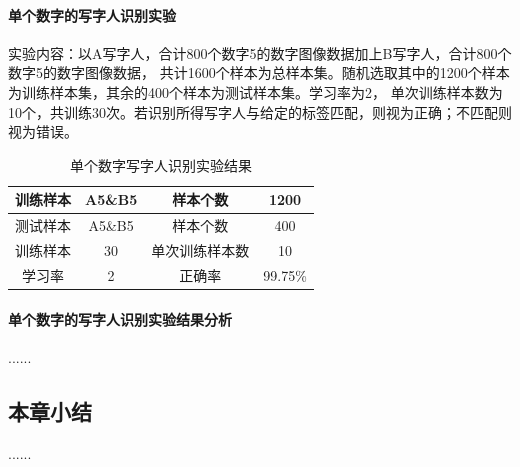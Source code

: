 \paragraph{单个数字的写字人识别实验}
实验内容：以A写字人，合计800个数字5的数字图像数据加上B写字人，合计800个数字5的数字图像数据，
共计1600个样本为总样本集。随机选取其中的1200个样本为训练样本集，其余的400个样本为测试样本集。学习率为2，
单次训练样本数为10个，共训练30次。若识别所得写字人与给定的标签匹配，则视为正确；不匹配则视为错误。
\begin{table}[!htbp]
    \centering
    \caption{单个数字写字人识别实验结果}
    \begin{tabular}[\textwidth]{c|c|c|c}
        \hline
        训练样本 & A5\&B5 & 样本个数 & 1200 \\
        \hline
        测试样本 & A5\&B5 & 样本个数 & 400 \\
        \hline
        训练样本 & 30 & 单次训练样本数 & 10 \\
        \hline
        学习率 & 2 & 正确率 & 99.75\% \\
        \hline
    \end{tabular}
\end{table}

\paragraph{单个数字的写字人识别实验结果分析}
......

\subsection{本章小结}
......

\newpage
